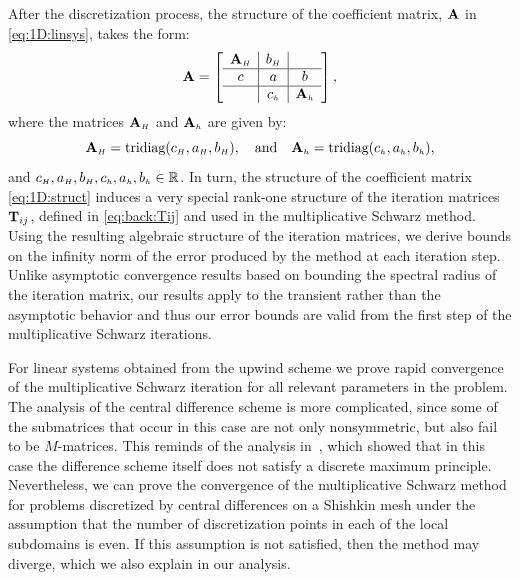 After the discretization process, the structure of the coefficient matrix,
$\mathbf{A}$ in \eqref{eq:1D:linsys}, takes the form:
%
\begin{equation}\label{eq:1D:struct}
\A=\left[
  \begin{array}{c|c|c}
     \matAH & \entryvE &          \\ \hline
  \entryzW  & \entryzC & \entryzE \\ \hline
            & \entrywW & \matAh
  \end{array}
\right],%
\end{equation}
where the matrices $\mathbf{A}_{\scriptscriptstyle H}$ and $\mathbf{A}_{\scriptscriptstyle h}$ %
are given by:
\begin{equation}
\mathbf{A}_{\scriptscriptstyle H} = \text{tridiag}(c_{\scriptscriptstyle H}, a_{\scriptscriptstyle H}, b_{\scriptscriptstyle H}),\quad \text{and} \quad
\mathbf{A}_{\scriptscriptstyle h} = \text{tridiag}(c_{\scriptscriptstyle h}, a_{\scriptscriptstyle h}, b_{\scriptscriptstyle h}),
\end{equation}
%
and $c_{\scriptscriptstyle H}, a_{\scriptscriptstyle H}, b_{\scriptscriptstyle H},c_{\scriptscriptstyle h}, a_{\scriptscriptstyle h}, b_{\scriptscriptstyle h}\in\mathbb{R}$. In turn,
the structure of the coefficient matrix \eqref{eq:1D:struct} induces a very
special rank-one structure of the iteration matrices $\mathbf{T}_{ij}$, defined in
\eqref{eq:back:Tij} and used in the multiplicative Schwarz method. Using the
resulting algebraic structure of the iteration matrices, we derive bounds on
the infinity norm of the error produced by the method at each iteration step.
Unlike asymptotic convergence results based on bounding the spectral radius of
the iteration matrix, our results apply to the transient rather than the
asymptotic behavior and thus our error bounds are valid from the first step of
the multiplicative Schwarz iterations.

For linear systems obtained from the upwind scheme we prove rapid convergence
of the  multiplicative Schwarz iteration for all relevant parameters in the
problem. The analysis of the central difference scheme is more complicated,
since some of the submatrices that occur in this case are not only
nonsymmetric, but also fail to be $M$-matrices. This reminds of the analysis
in~\cite{AndKop96}, which showed that in this case the difference scheme
itself does not satisfy a discrete maximum principle. Nevertheless, we can
prove the convergence of the multiplicative Schwarz method for problems
discretized by central differences on a Shishkin mesh under the assumption
that the number of discretization points in each of the local subdomains is
even. If this assumption is not satisfied, then the method may diverge, which
we also explain in our analysis.

